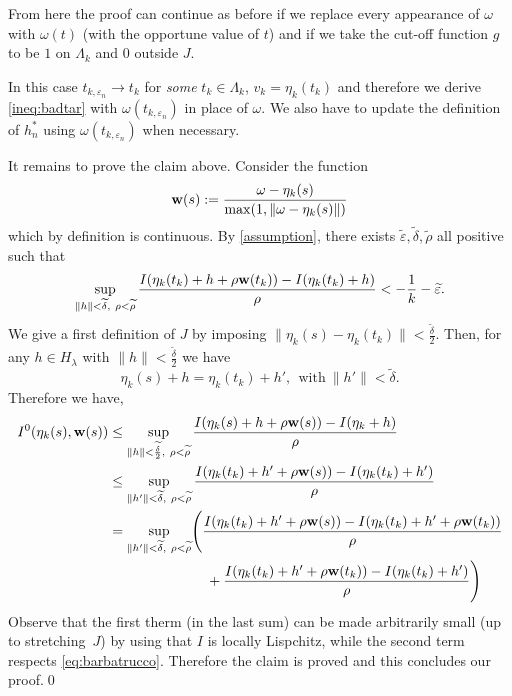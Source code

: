 \documentclass[11pt]{amsart}
\numberwithin{equation}{section} %
\theoremstyle{definition}
\newcommand{\m}{\mbox}
\newcommand{\cor}{\textit}
\newcommand{\fine}{\qed\newline}
\begin{document}
From here the proof can continue as before if we replace every appearance of $\omega$ with 
$\omega(t)$ (with the opportune value of $t$)
and if we take the cut-off function $g$ to be $1$ on $\Lambda_k$ and $0$ outside $J$.

In this case $t_{k,\varepsilon_n}\to t_k$ for \cor{some} $t_k\in \Lambda_k$,
$v_k=\eta_k(t_k)$
and therefore we derive \eqref{ineq:badtar}
with $\omega(t_{k,\varepsilon_n})$ in place of $\omega$.
We also have to update the definition of $h_n^*$ using
$\omega(t_{k,\varepsilon_n})$ when necessary.\newline

It remains to prove the claim above.
Consider the function
\[
{\bf{w}}(s):=\frac{\omega-\eta_k(s)}{\max(1,\|\omega-\eta_k(s)\|)}
\]
which by definition is continuous.
By \eqref{assumption}, there exists $\widetilde \varepsilon, \widetilde \delta,\widetilde \rho$ all positive
such that %
\begin{equation}\label{eq:barbatrucco}
	\sup_{\|h\|<\widetilde \delta,\ \rho<\widetilde \rho}\frac{I(\eta_k(t_k)+h+\rho{\bf w}(t_k))-I(\eta_k(t_k)+h)}{\rho}<-\frac{1}{k}-\widetilde \varepsilon.
\end{equation}
We give a first definition of $J$ by imposing $\|\eta_k(s)-\eta_k(t_k)\|<\frac{\widetilde \delta}{2}$.
Then, for any $h\in H_\lambda$ with $\|h\|<\frac{\widetilde \delta}{2}$ we have
\[
\eta_k(s)+h=\eta_k(t_k)+h',\ \ \m{with}\ \|h'\|<\widetilde \delta.
\]
Therefore we have,
\begin{align*}
	I^0(\eta_k(s),{\bf w}(s))&\leq \sup_{\|h\|<\frac{\widetilde \delta}{2},\ \rho<\widetilde \rho}
	\frac{I(\eta_k(s)+h+\rho {\bf w}(s))-I(\eta_k+h)}{\rho}\\
	&\leq \sup_{\|h'\|<\widetilde \delta,\ \rho<\widetilde \rho}
	\frac{I(\eta_k(t_k)+h'+\rho {\bf w}(s))-I(\eta_k(t_k)+h')}{\rho}\\
	&=\sup_{\|h'\|<\widetilde \delta,\ \rho<\widetilde \rho}\Biggl(
	\frac{I(\eta_k(t_k)+h'+\rho{\bf w}(s))-I(\eta_k(t_k)+h'+\rho{\bf w}(t_k))}{\rho}\\
	\vspace{12pt}
	&\quad \quad \quad \quad \quad \quad \quad
	+\frac{I(\eta_k(t_k)+h'+\rho{\bf w}(t_k))-I(\eta_k(t_k)+h')}{\rho}\Biggl)
\end{align*}
Observe that the first therm (in the last sum) can be made arbitrarily small (up to stretching~$J$) by using that 
$I$ is locally Lispchitz, while the second term respects \eqref{eq:barbatrucco}. Therefore the claim is proved
and this concludes our proof.\fine
\end{document}
